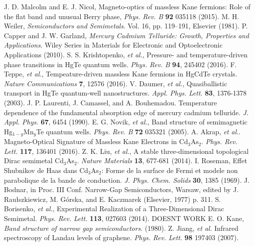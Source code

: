 \documentclass[titlepage,a4paper]{book}
\begin{document}
\begin{thebibliography}{199}
J. D. Malcolm and E. J. Nicol, Magneto-optics of massless Kane fermions: Role of the flat band and unusual Berry phase, \textit{Phys. Rev. B} \textbf{92} 035118 (2015).
M. H. Weiler, \textit{Semiconductors and Semimetals}. Vol. 16, pp. 119–191, Elsevier (1981).
P. Capper and J. W. Garland, \textit{Mercury Cadmium Telluride: Growth, Properties and Applications}. Wiley Series in Materials for Electronic and Optoelectronic Applications (2010).
S. S. Krishtopenko, \textit{et al.}, Pressure- and temperature-driven phase transitions in HgTe quantum wells. \textit{Phys. Rev. B} \textbf{94}, 245402 (2016).
F. Teppe, \textit{et al.}, Tempeature-driven massless Kane fermions in HgCdTe crystals. \textit{Nature Communications} \textbf{7}, 12576 (2016).
V. Daumer, \textit{et al.}, Quasiballistic transport in HgTe quantum-well nanostructures. \textit{Appl. Phys. Lett.} \textbf{83}, 1376-1378 (2003).
J. P. Laurenti, J. Camassel, and A. Bouhemadou. Temperature dependence of the fundamental absorption edge of mercury cadmium telluride. \textit{J. Appl. Phys.} \textbf{67}, 6454 (1990).
E. G. Novik, \textit{et al.}, Band structure of semimagnetic Hg$_{1-y}$Mn$_y$Te quantum wells. \textit{Phys. Rev. B} \textbf{72} 035321 (2005).
A. Akrap, \textit{et al.}. Magneto-Optical Signature of Massless Kane Electrons in Cd$_3$As$_2$. \textit{Phys. Rev. Lett.} \textbf{117}, 136401 (2016). 
Z. K. Liu, \textit{et al.}, A stable three-dimensional topological Dirac semimetal Cd$_3$As$_2$. \textit{Nature Materials} \textbf{13}, 677-681 (2014).  
I. Roseman, Effet Shubnikov de Haas dans Cd$_3$As$_2$: Forme de la surface de Fermi et modele non parabolique de la bande de conduction. \textit{J. Phys. Chem. Solids} \textbf{30}, 1385 (1969).
J. Bodnar, in Proc. III Conf. Narrow-Gap Semiconductors, Warsaw, edited by J. Raułszkiewicz, M. Górska, and E. Kaczmarek (Elsevier, 1977) p. 311.
S. Borisenko, \textit{et al.}, Experimental Realization of a Three-Dimensional Dirac Semimetal. \textit{Phys. Rev. Lett.} \textbf{113}, 027603 (2014).
DOESNT WORK
E. O. Kane, \textit{Band structure of narrow gap semiconductors.} (1980).
Z. Jiang, \textit{et al.} Infrared spectroscopy of Landau levels of graphene. \textit{Phys. Rev. Lett.} \textbf{98} 197403 (2007).

\end{thebibliography}
\end{document}
